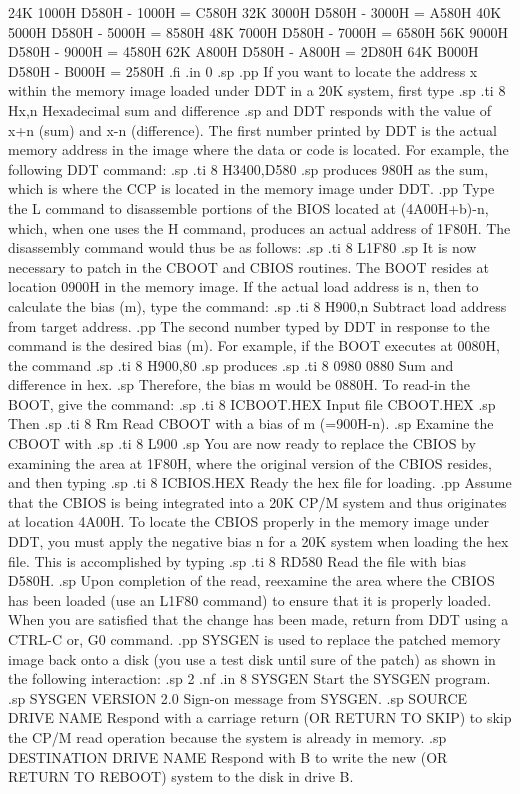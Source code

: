 24K          1000H     D580H - 1000H = C580H
32K          3000H     D580H - 3000H = A580H
40K          5000H     D580H - 5000H = 8580H
48K          7000H     D580H - 7000H = 6580H
56K          9000H     D580H - 9000H = 4580H
62K          A800H     D580H - A800H = 2D80H
64K          B000H     D580H - B000H = 2580H
.fi
.in 0
.sp 
.pp
If you want to locate the address x within the memory image 
loaded under DDT in a 20K system, first type
.sp
.ti 8
Hx,n            Hexadecimal sum and difference
.sp
and DDT responds with the value of x+n (sum) and x-n 
(difference).  The first number printed by DDT is the actual memory 
address in the image where the data or code is located.  For example, 
the following DDT command:
.sp
.ti 8
H3400,D580
.sp
produces 980H as the sum, which is where the CCP 
is located in the memory image under DDT.
.pp
Type the L command to disassemble portions of the 
BIOS located at (4A00H+b)-n, which, when one uses the H command, 
produces an actual address of 1F80H.  The disassembly command 
would thus be as follows:
.sp
.ti 8
L1F80
.sp
It is now necessary to patch in the CBOOT and CBIOS routines.  The BOOT 
resides at location 0900H in the memory image.  If the actual 
load address is n, then to calculate the bias (m), 
type the command:
.sp
.ti 8
H900,n          Subtract load address from target address.
.pp
The second number typed by DDT in response to the command is the 
desired bias (m).  For example, if the BOOT executes at 0080H, 
the command
.sp
.ti 8
H900,80
.sp
produces
.sp
.ti 8
0980 0880       Sum and difference in hex.
.sp
Therefore, the bias m would be 0880H.  To read-in the BOOT, give the command:
.sp
.ti 8
ICBOOT.HEX      Input file CBOOT.HEX
.sp
Then
.sp 
.ti 8
Rm              Read CBOOT with a bias of m (=900H-n).
.sp
Examine the CBOOT with
.sp
.ti 8
L900
.sp
You are now ready to replace the CBIOS by examining the area at 
1F80H, where the original version of the CBIOS resides, and then 
typing 
.sp
.ti 8
ICBIOS.HEX      Ready the hex file for loading.
.pp
Assume that the CBIOS is being integrated into a 20K 
CP/M system and thus originates at location 4A00H.  To locate the 
CBIOS properly in the memory image under DDT, you must apply the 
negative bias n for a 20K system when loading the hex file.  This 
is accomplished by typing
.sp
.ti 8
RD580           Read the file with bias D580H.
.sp
Upon completion of the read, reexamine the area 
where the CBIOS has been loaded (use an L1F80 command) to ensure 
that it is properly loaded.  When you are satisfied that the change has 
been made, return from DDT using a CTRL-C or, G0 command.
.pp
SYSGEN is used to replace the patched memory image back onto a 
disk (you use a test disk until sure of the 
patch) as shown in the following interaction:
.sp 2
.nf
.in 8
SYSGEN                    Start the SYSGEN program.
.sp
SYSGEN VERSION 2.0        Sign-on message from SYSGEN.     
.sp
SOURCE DRIVE NAME         Respond with a carriage return 
(OR RETURN TO SKIP)       to skip the CP/M read operation 
                          because the system is already 
                          in memory.
.sp
DESTINATION DRIVE NAME    Respond with B to write the new   
(OR RETURN TO REBOOT)     system to the disk in drive B. 
                      
